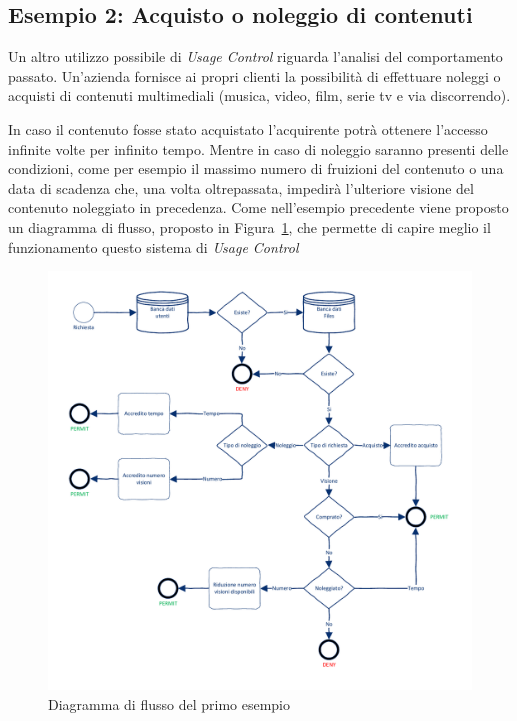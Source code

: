 \subsection*{Esempio 2: Acquisto o noleggio di contenuti}
Un altro utilizzo possibile di \textit{Usage Control} riguarda l'analisi del comportamento passato. Un'azienda fornisce  ai propri clienti 
la possibilità di effettuare noleggi o acquisti di contenuti multimediali (musica, video, film, serie tv e via discorrendo).\\ \par
In caso il contenuto fosse stato acquistato l'acquirente potrà ottenere l'accesso infinite volte per infinito tempo. Mentre in caso di noleggio
saranno presenti delle condizioni, come per esempio il massimo numero di fruizioni del contenuto o una data di scadenza che, una volta oltrepassata, impedirà l'ulteriore visione del contenuto noleggiato in precedenza.
Come nell'esempio precedente viene proposto un diagramma di flusso, proposto in Figura~\ref{fig:diagrammaflussosecondoesempio}, che permette di capire meglio il funzionamento questo sistema di \textit{Usage Control}
\begin{figure}[H]
 \centering 
 \includegraphics[scale = 0.75]{./Visio_Project/DiagrammaFlussoSecondoEsempio.pdf}
 \caption{Diagramma di flusso del primo esempio}
 \label{fig:diagrammaflussosecondoesempio}
\end{figure}
